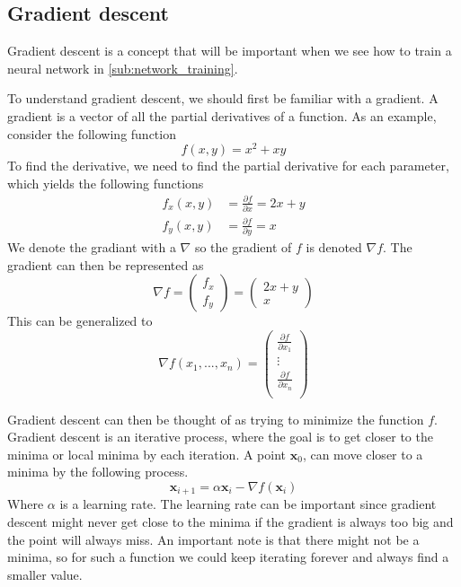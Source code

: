 \subsection{Gradient descent}
Gradient descent is a concept that will be important when we see how to train a neural network in \autoref{sub:network_training}.

To understand gradient descent, we should first be familiar with a gradient.
A gradient is a vector of all the partial derivatives of a function.
As an example, consider the following function
$$f(x,y) = x^2 + xy$$
To find the derivative, we need to find the partial derivative for each parameter, which yields the following functions
\begin{align*}
  f_x(x,y) &= \frac{\partial f}{\partial x} = 2x + y\\
  f_y(x,y) &= \frac{\partial f}{\partial y} = x
\end{align*}
We denote the gradiant with a $\nabla$ so the gradient of $f$ is denoted $\nabla f$. The gradient can then be represented as
$$\nabla f = \left( \begin{array}{c}
  f_x\\
  f_y
\end{array} \right) = \left( \begin{array}{c}
  2x + y\\
  x
\end{array} \right)$$
This can be generalized to
$$\nabla f(x_1, ..., x_n) = \left( \begin{array}{c}
    \frac{\partial f}{\partial x_1}\\
    \vdots\\
    \frac{\partial f}{\partial x_n}\\
\end{array} \right)$$

Gradient descent can then be thought of as trying to minimize the function $f$.
Gradient descent is an iterative process, where the goal is to get closer to the minima or local minima by each iteration.
A point $\bm{x}_0$, can move closer to a minima by the following process.
$$\bm{x}_{i+1} = \alpha \bm{x}_i - \nabla f(\bm{x}_i)$$
Where $\alpha$ is a learning rate. The learning rate can be important since gradient descent might never get close to the minima if the gradient is always too big and the point will always miss.
An important note is that there might not be a minima, so for such a function we could keep iterating forever and always find a smaller value.
